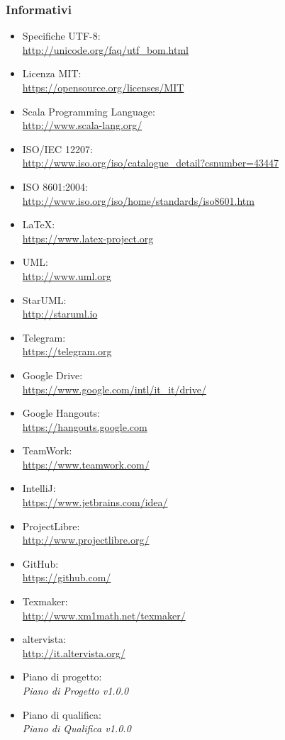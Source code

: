 \documentclass[a4paper]{article}
\begin{document}
			\subsubsection{Informativi}
				\begin{itemize}
					\item Specifiche UTF-8: \\ \url{http://unicode.org/faq/utf_bom.html}
					\item Licenza MIT: \\ \url{https://opensource.org/licenses/MIT}
					\item Scala Programming Language: \\ \url{http://www.scala-lang.org/}
					\item ISO/IEC 12207: \\ \url{http://www.iso.org/iso/catalogue_detail?csnumber=43447}
					\item ISO 8601:2004: \\ \url{http://www.iso.org/iso/home/standards/iso8601.htm}
					\item \LaTeX: \\ \url{https://www.latex-project.org}
					\item UML: \\ \url{http://www.uml.org}
					\item StarUML: \\ \url{http://staruml.io}
					\item Telegram: \\ \url{https://telegram.org}
					\item Google Drive: \\ \url{https://www.google.com/intl/it_it/drive/}
					\item Google Hangouts: \\ \url{https://hangouts.google.com}
					\item TeamWork: \\ \url{https://www.teamwork.com/}
					\item IntelliJ: \\ \url{https://www.jetbrains.com/idea/}
					\item ProjectLibre: \\ \url{http://www.projectlibre.org/}
					\item GitHub: \\ \url{https://github.com/}
					\item Texmaker: \\ \url{http://www.xm1math.net/texmaker/}
					\item altervista: \\ \url{http://it.altervista.org/}
					\item Piano di progetto: \\ \emph{Piano di Progetto v1.0.0}
					\item Piano di qualifica: \\ \emph{Piano di Qualifica v1.0.0}
				\end{itemize}
\end{document}

